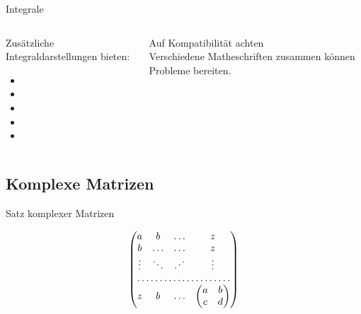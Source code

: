 \documentclass[
	vorläufig=false,
	datum=2017-11-17,
	titel={Mathematiksatz II},
	web=true,
	mo,
	aspectratio=1610,
]{../tex/latexkurs-slides}
\begin{document}
\begin{frame}[fragile]{Integrale}
\begin{columns}
\begin{column}{.4\textwidth}
Zusätzliche Integraldarstellungen bieten:
\begin{itemize}
\item {}
\item {}
\item {}
\item {}
\item {}
\end{itemize}
\end{column}
\begin{column}{.5\textwidth}
\alert{Auf Kompatibilität achten}\\
Verschiedene Matheschriften zusammen können Probleme bereiten.
\end{column}
\end{columns}
\end{frame}


\subsection{Komplexe Matrizen}
\begin{frame}[fragile]{Satz komplexer Matrizen}
\begin{LTXexample}[width=.4\textwidth]
\[
  \begin{pmatrix}
    a & b     & \dots & z\\
    b & \dots & \dots & z\\
    \vdots & \ddots& \reflectbox{$\ddots$} & \vdots\\
    \hdotsfor{4}\\
    z & b & \dots &
    \begin{pmatrix}
      a & b \\ c & d
    \end{pmatrix}
  \end{pmatrix}
\]

\end{LTXexample}
\end{frame}
\end{document}
